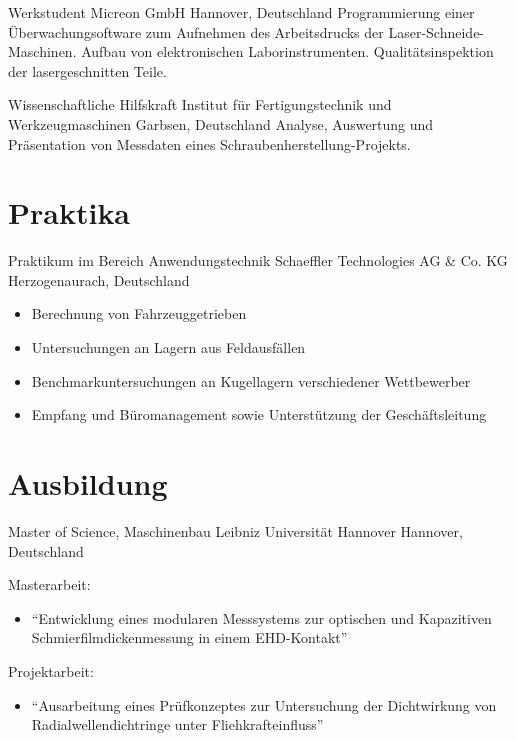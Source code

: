\documentclass[11pt,a4paper,sans]{moderncv}
\begin{document}
{Werkstudent}
{Micreon GmbH}
{Hannover, Deutschland}
{}
{
Programmierung einer Überwachungsoftware zum Aufnehmen des Arbeitsdrucks der Laser-Schneide-Maschinen.
Aufbau von elektronischen Laborinstrumenten.
Qualitätsinspektion der lasergeschnitten Teile.
}

{Wissenschaftliche Hilfskraft}
{Institut für Fertigungstechnik und Werkzeugmaschinen}
{Garbsen, Deutschland}
{}
{
Analyse, Auswertung und Präsentation von Messdaten eines Schraubenherstellung-Projekts.
}

\section{\textbf{Praktika}}
{Praktikum im Bereich Anwendungstechnik}
{Schaeffler Technologies AG \& Co. KG}
{Herzogenaurach, Deutschland}
{}
{
    \begin{itemize}
        \item Berechnung von Fahrzeuggetrieben
        \item Untersuchungen an Lagern aus Feldausfällen
        \item Benchmarkuntersuchungen an Kugellagern verschiedener Wettbewerber
        \item Empfang und Büromanagement sowie Unterstützung der Geschäftsleitung
    \end{itemize}
}

\section{\textbf{Ausbildung}}

{Master of Science, Maschinenbau}
{Leibniz Universität Hannover}
{Hannover, Deutschland}
{}
{
    Masterarbeit:
    \begin{itemize}
        \item ``Entwicklung eines modularen Messsystems zur optischen und Kapazitiven Schmierfilmdickenmessung in einem EHD-Kontakt''
    \end{itemize}
    Projektarbeit:
    \begin{itemize}
        \item "`Ausarbeitung eines Prüfkonzeptes zur Untersuchung der Dichtwirkung von Radialwellendichtringe unter Fliehkrafteinfluss"'
    \end{itemize}
}
\end{document}
